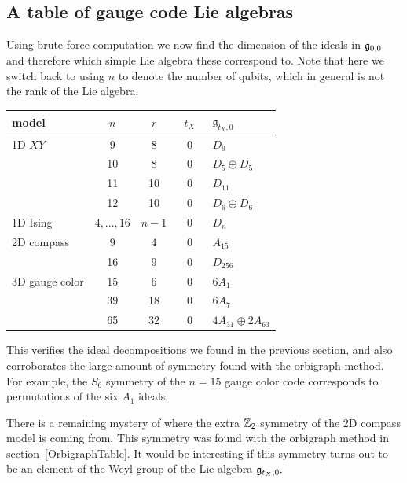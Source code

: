 \subsection{A table of gauge code Lie algebras}

Using brute-force computation
we now find the dimension of the ideals in $\mathfrak{g}_{0,0}$
and therefore which simple Lie algebra these correspond to.
Note that here we switch back to
using $n$ to denote the number of qubits,
which in general is not the rank of the Lie algebra.
\begin{center}
\begin{tabular}{ l|c|c|c|l } 
model &\ $n$\ &\ $r$\ &\ $t_X$\ & $\mathfrak{g}_{t_X,0}$   \\
\hline
     1D $XY$  &  9 &  8 & 0 & $D_9$   \\
             & 10 &  8 & 0 & $D_5\oplus D_5$   \\
             & 11 &  10 & 0 & $D_{11}$   \\
             & 12 &  10 & 0 & $D_6\oplus D_6$   \\
\hline
    1D Ising & $4,...,16$  & $n-1$  & 0  & $D_n$   \\
\hline
    2D compass & 9 & 4 & 0 &  $A_{15}$  \\
            & 16 & 9 & 0 & $D_{256}$ \\
\hline
    3D gauge color & 15 & 6  & 0 & $6A_1$  \\
                & 39 & 18 & 0 & $6A_{7}$ \\
                & 65 & 32 & 0 & $4A_{31}\oplus 2A_{63} $  \\
\end{tabular}
\end{center}

This verifies the ideal decompositions we found in the
previous section, and also corroborates the large
amount of symmetry found with the orbigraph method.
For example, the $S_6$ symmetry of
the $n=15$ gauge color code corresponds to
permutations of the six $A_1$ ideals.

There is a remaining mystery of where
the extra $\mathbb{Z}_2$ symmetry of the 2D compass model is coming from.
This symmetry was found with the orbigraph method in section~\ref{OrbigraphTable}.
It would be interesting if this symmetry turns out to be an element
of the Weyl group of the Lie algebra $\mathfrak{g}_{t_X,0}.$

